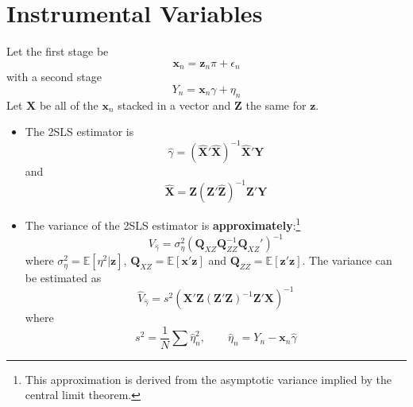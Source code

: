 \documentclass[12pt]{article}
\numberwithin{equation}{section}
\numberwithin{figure}{section}
\numberwithin{table}{section}
\begin{document}
  \section*{Instrumental Variables}
  Let the first stage be
  \[ \bm{x}_{n} = \bm{z}_{n}\pi + \epsilon_{n} \]
  with a second stage
  \[ Y_{n} = \bm{x}_{n}\gamma + \eta_{n} \]
  Let $\bm{X}$ be all of the $\bm{x}_{n}$ stacked in a vector and $\bm{Z}$ the same for $\bm{z}$. 
  
  \begin{itemize}
    \item The 2SLS estimator is 
    \[ \hat{\gamma} = (\hat{\bm{X}}'\hat{\bm{X}})^{-1}\hat{\bm{X}}'\bm{Y}\] 
    and
    \[ \hat{\bm{X}} = \bm{Z}(\bm{Z}'\hat{\bm{Z}})^{-1}\bm{Z}'{\bm{Y}} \]
    \item The variance of the 2SLS estimator is \textbf{approximately}:\footnote{This approximation is derived from the asymptotic variance implied by the central limit theorem.} 
    \[ V_{\hat{\gamma}} = \sigma^2_{\eta}\left(\bm{Q}_{XZ}\bm{Q}_{ZZ}^{-1}\bm{Q}_{XZ}'\right)^{-1} \]
    where $\sigma^2_{\eta} = \mathbb{E}[\eta^2|\bm{z}]$, $\bm{Q}_{XZ}=\mathbb{E}[\bm{x}'\bm{z}]$ and $\bm{Q}_{ZZ} = \mathbb{E}[\bm{z}'\bm{z}]$.
    The variance can be estimated as
    \[ \hat{V}_{\hat{\gamma}} = s^2(\bm{X}'\bm{Z}(\bm{Z}'\bm{Z})^{-1}\bm{Z}'\bm{X})^{-1} \]
    where 
    \[ s^2 = \frac{1}{N}\sum \hat{\eta}_{n}^2,\qquad \hat{\eta}_{n} = Y_{n}-\bm{x}_{n}\hat{\gamma} \]
  \end{itemize}
\end{document}
